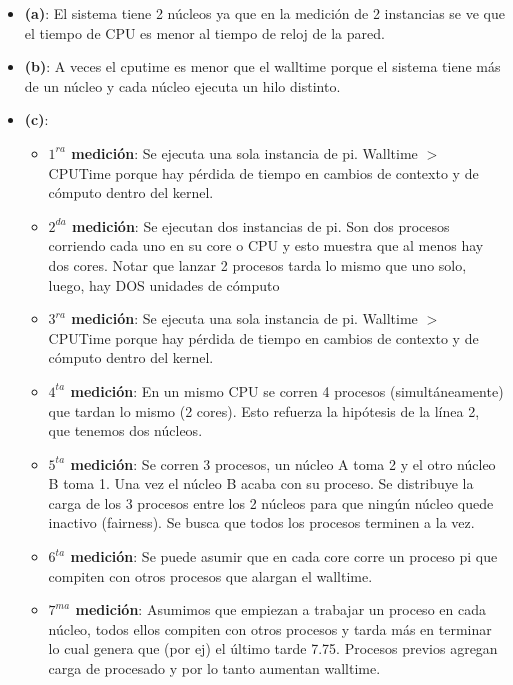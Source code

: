 \documentclass[12pt]{article}
\begin{document}
\begin{rta}
    \begin{itemize}
        \item \textbf{(a)}: El sistema tiene 2 núcleos ya que en la medición de 2 instancias se ve que el tiempo de CPU es menor al tiempo de reloj de la pared.
        \item \textbf{(b)}: A veces el cputime es menor que el walltime porque el sistema tiene más de un núcleo y cada núcleo ejecuta un hilo distinto.
        \item \textbf{(c)}:
        \begin{itemize}
            \item \textbf{$1^{ra}$ medición}: Se ejecuta una sola instancia de pi. Walltime $>$ CPUTime porque hay pérdida de tiempo en cambios de contexto y de cómputo dentro del kernel.
            \item \textbf{$2^{da}$ medición}: Se ejecutan dos instancias de pi. Son dos procesos corriendo cada uno en su core o CPU y esto muestra que al menos hay dos cores. Notar que lanzar 2 procesos tarda lo mismo que uno solo, luego, hay DOS unidades de cómputo
            \item \textbf{$3^{ra}$ medición}: Se ejecuta una sola instancia de pi. Walltime $>$ CPUTime porque hay pérdida de tiempo en cambios de contexto y de cómputo dentro del kernel.
            \item \textbf{$4^{ta}$ medición}: En un mismo CPU se corren 4 procesos (simultáneamente) que tardan lo mismo (2 cores). Esto refuerza la hipótesis de la línea 2, que tenemos dos núcleos.
            \item \textbf{$5^{ta}$ medición}: Se corren 3 procesos, un núcleo A toma 2 y el otro núcleo B toma 1. Una vez el núcleo B acaba con su proceso.  Se distribuye la carga de los 3 procesos entre los 2 núcleos para que ningún núcleo quede inactivo (fairness). Se busca que todos los procesos terminen a la vez.
            \item \textbf{$6^{ta}$ medición}: Se puede asumir que en cada core corre un proceso pi que compiten con otros procesos que alargan el walltime.
            \item \textbf{$7^{ma}$ medición}: Asumimos que empiezan a trabajar un proceso en cada núcleo, todos ellos compiten con otros procesos y tarda más en terminar lo cual genera que (por ej) el último tarde 7.75. Procesos previos agregan carga de procesado y por lo tanto aumentan walltime.
        \end{itemize}
    \end{itemize}
\end{rta}
\end{document}
